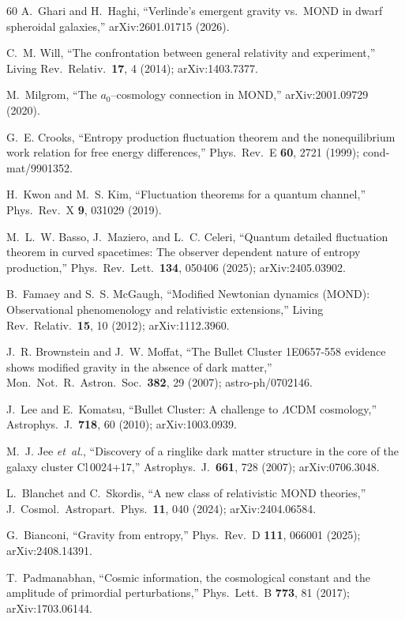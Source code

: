 \documentclass[prd,twocolumn,superscriptaddress,longbibliography,floatfix]{revtex4-2}
\begin{document}
\begin{thebibliography}{60}
A.~Ghari and H.~Haghi,
``Verlinde's emergent gravity vs.\ MOND in dwarf spheroidal
galaxies,''
arXiv:2601.01715 (2026).

C.~M. Will,
``The confrontation between general relativity and experiment,''
Living Rev.\ Relativ.\ \textbf{17}, 4 (2014);
arXiv:1403.7377.

M.~Milgrom,
``The $a_0$--cosmology connection in MOND,''
arXiv:2001.09729 (2020).

G.~E. Crooks,
``Entropy production fluctuation theorem and the nonequilibrium
work relation for free energy differences,''
Phys.\ Rev.\ E \textbf{60}, 2721 (1999);
cond-mat/9901352.

H.~Kwon and M.~S. Kim,
``Fluctuation theorems for a quantum channel,''
Phys.\ Rev.\ X \textbf{9}, 031029 (2019).

M.~L.~W. Basso, J.~Maziero, and L.~C. Celeri,
``Quantum detailed fluctuation theorem in curved spacetimes:
The observer dependent nature of entropy production,''
Phys.\ Rev.\ Lett.\ \textbf{134}, 050406 (2025);
arXiv:2405.03902.

B.~Famaey and S.~S. McGaugh,
``Modified Newtonian dynamics (MOND): Observational
phenomenology and relativistic extensions,''
Living Rev.\ Relativ.\ \textbf{15}, 10 (2012);
arXiv:1112.3960.

J.~R. Brownstein and J.~W. Moffat,
``The Bullet Cluster 1E0657-558 evidence shows modified gravity
in the absence of dark matter,''
Mon.\ Not.\ R.\ Astron.\ Soc.\ \textbf{382}, 29 (2007);
astro-ph/0702146.

J.~Lee and E.~Komatsu,
``Bullet Cluster: A challenge to $\Lambda$CDM cosmology,''
Astrophys.\ J.\ \textbf{718}, 60 (2010);
arXiv:1003.0939.

M.~J. Jee \emph{et~al.},
``Discovery of a ringlike dark matter structure in the core of
the galaxy cluster Cl\,0024+17,''
Astrophys.\ J.\ \textbf{661}, 728 (2007);
arXiv:0706.3048.

L.~Blanchet and C.~Skordis,
``A new class of relativistic MOND theories,''
J.\ Cosmol.\ Astropart.\ Phys.\ \textbf{11}, 040 (2024);
arXiv:2404.06584.

G.~Bianconi,
``Gravity from entropy,''
Phys.\ Rev.\ D \textbf{111}, 066001 (2025);
arXiv:2408.14391.

T.~Padmanabhan,
``Cosmic information, the cosmological constant and the
amplitude of primordial perturbations,''
Phys.\ Lett.\ B \textbf{773}, 81 (2017);
arXiv:1703.06144.


\end{thebibliography}
\end{document}
